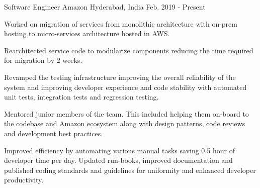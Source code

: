 

\begin{cventries}


    \cventry
    {Software Engineer} %
    {Amazon} %
    {Hyderabad, India} %
    {Feb. 2019 - Present} %
    { \begin{cvitems} %
            \item{Worked on migration of services from monolithic architecture with on-prem hosting to micro-services architecture hosted in AWS.} %
            \item {Rearchitected  service code to modularize components reducing the time required for migration by 2 weeks.}
            \item {Revamped the testing infrastructure improving the overall reliability of the system and improving developer experience and code stability with automated unit tests, integration tests and regression testing.}  %
            \item {Mentored junior members of the team. This included helping them on-board to the codebase and Amazon ecosystem along with design patterns, code reviews and development best practices.}    
            \item {Improved efficiency by automating various manual tasks saving 0.5 hour of developer time per day. Updated run-books, improved documentation and published coding standards and guidelines for uniformity and enhanced developer productivity.}  %
        \end{cvitems}
    }




\end{cventries}
